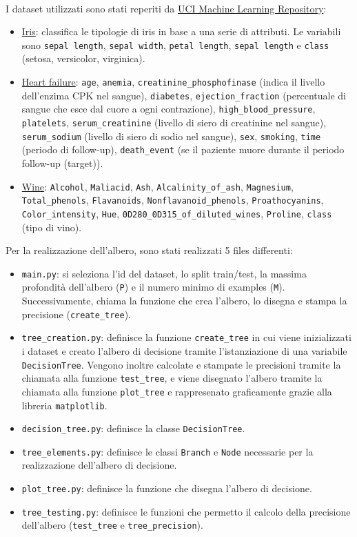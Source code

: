 \documentclass{article}
\begin{document}
\\
I dataset utilizzati sono stati reperiti da \href{https://archive.ics.uci.edu/}{UCI Machine Learning Repository}:
\begin{itemize}
	\item \href{https://archive.ics.uci.edu/dataset/53/iris}{Iris}: classifica le tipologie di iris in base a una serie di attributi. Le variabili sono \texttt{sepal length}, \texttt{sepal width}, \texttt{petal length}, \texttt{sepal length} e \texttt{class} (setosa, versicolor, virginica).
	\item \href{https://archive.ics.uci.edu/dataset/519/heart+failure+clinical+records}{Heart failure}: \texttt{age}, \texttt{anemia}, \texttt{creatinine\_phosphofinase} (indica il livello dell'enzima CPK nel sangue), \texttt{diabetes}, \texttt{ejection\_fraction} (percentuale di sangue che esce dal cuore a ogni contrazione), \texttt{high\_blood\_pressure}, \texttt{platelets}, \texttt{serum\_creatinine} (livello di siero di creatinine nel sangue), \texttt{serum\_sodium} (livello di siero di sodio nel sangue), \texttt{sex}, \texttt{smoking}, \texttt{time} (periodo di follow-up), \texttt{death\_event} (se il paziente muore durante il periodo follow-up (target)).
	\item \href{https://archive.ics.uci.edu/dataset/109/wine}{Wine}: \texttt{Alcohol}, \texttt{Maliacid}, \texttt{Ash}, \texttt{Alcalinity\_of\_ash}, \texttt{Magnesium}, \texttt{Total\_phenols}, \texttt{Flavanoids}, \texttt{Nonflavanoid\_phenols}, \texttt{Proathocyanins}, \texttt{Color\_intensity}, \texttt{Hue}, \texttt{0D280\_0D315\_of\_diluted\_wines}, \texttt{Proline}, \texttt{class} (tipo di vino).
\end{itemize}
Per la realizzazione dell'albero, sono stati realizzati 5 files differenti:
\begin{itemize}
	\item \texttt{main.py}: si seleziona l'id del dataset, lo split train/test, la massima profondità dell'albero (\texttt{P}) e il numero minimo di examples (\texttt{M}). Successivamente, chiama la funzione che crea l'albero, lo disegna e stampa la precisione (\texttt{create\_tree}).
	\item \texttt{tree\_creation.py}: definisce la funzione \texttt{create\_tree} in cui viene inizializzati i dataset e creato l'albero di decisione tramite l'istanziazione di una variabile \texttt{DecisionTree}. Vengono inoltre calcolate e stampate le precisioni tramite la chiamata alla funzione \texttt{test\_tree}, e viene disegnato l'albero tramite la chiamata alla funzione \texttt{plot\_tree} e rappresenato graficamente grazie alla libreria \texttt{matplotlib}.
	\item \texttt{decision\_tree.py}: definisce la classe \texttt{DecisionTree}.
	\item \texttt{tree\_elements.py}: definisce le classi \texttt{Branch} e \texttt{Node} necessarie per la realizzazione dell'albero di decisione.
	\item \texttt{plot\_tree.py}: definisce la funzione che disegna l'albero di decisione.
	\item \texttt{tree\_testing.py}: definisce le funzioni che permetto il calcolo della precisione dell'albero (\texttt{test\_tree} e \texttt{tree\_precision}).
\end{itemize}
\end{document}
